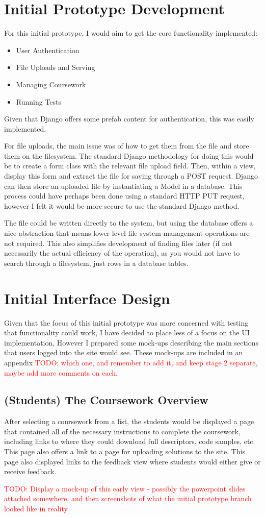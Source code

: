 \documentclass[a4paper,11pt]{report}
\newcommand{\todo}[1]{\textcolor{red}{TODO: #1}}
\begin{document}
\section{Initial Prototype Development}
For this initial prototype, I would aim to get the core functionality implemented:
\begin{itemize}
\item User Authentication
\item File Uploads and Serving
\item Managing Coursework
\item Running Tests
\end{itemize}
Given that Django offers some prefab content for authentication, this was easily implemented.\par
For file uploads, the main issue was of how to get them from the file and store them on the filesystem. The standard Django methodology for doing this would be to create a form class with the relevant file upload field. Then, within a view, display this form and extract the file for saving through a POST request. Django can then store an uploaded file by instantiating a Model in a database. This process could have perhaps been done using a standard HTTP PUT request, however I felt it would be more secure to use the standard Django method.\par
The file could be written directly to the system, but using the database offers a nice abstraction that means lower level file system management operations are not required. This also simplifies development of finding files later (if not necessarily the actual efficiency of the operation), as you would not have to search through a filesystem, just rows in a database tables.\par
\section{Initial Interface Design}
Given that the focus of this initial prototype was more concerned with testing that functionality could work, I have decided to place less of a focus on the UI implementation, However I prepared some mock-ups describing the main sections that users logged into the site would see. These mock-ups are included in an appendix \todo{which one, and remember to add it, and keep stage 2 separate, maybe add more comments on each}.
\subsection{(Students) The Coursework Overview}
After selecting a coursework from a list, the students would be displayed a page that contained all of the necessary instructions to complete the coursework, including links to where they could download full descriptors, code samples, etc. This page also offers a link to a page for uploading solutions to the site. This page also displayed links to the feedback view where students would either give or receive feedback.\par
\todo{Display a mock-up of this early view - possibly the powerpoint slides attached somewhere, and then screenshots of what the initial prototype branch looked like in reality}
\end{document}
